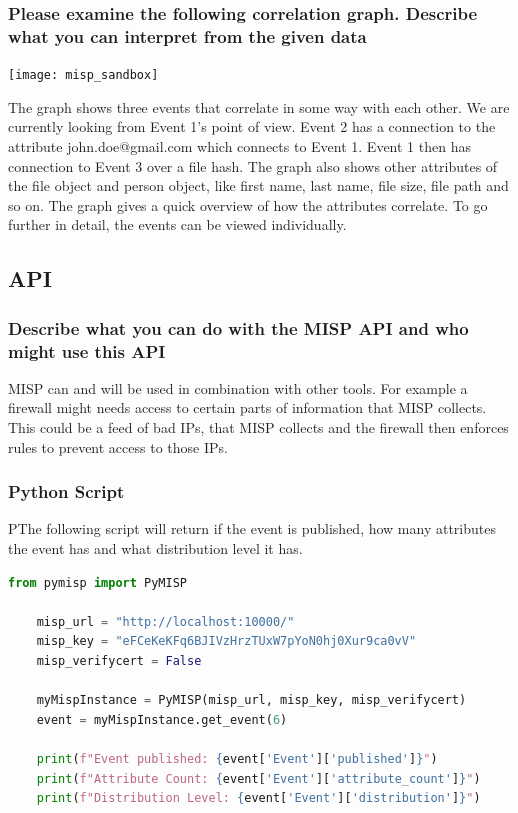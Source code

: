 \subsubsection{Please examine the following correlation graph. Describe what you can interpret from the given data}
\begin{center}
    \texttt{[image: misp\_sandbox]}
    \vspace{-8pt}
\end{center}

The graph shows three events that correlate in some way with each other. We are currently looking from Event 1's point of view. Event 2 has a connection to the attribute john.doe@gmail.com which connects to Event 1. Event 1 then has connection to Event 3 over a file hash.
The graph also shows other attributes of the file object and person object, like first name, last name, file size, file path and so on.
The graph gives a quick overview of how the attributes correlate. To go further in detail, the events can be viewed individually.

\subsection{API}

\subsubsection{Describe what you can do with the MISP API and who might use this API}
MISP can and will be used in combination with other tools. For example a firewall might needs access to certain parts of information that MISP collects. This could be a feed of bad IPs, that MISP collects and the firewall then enforces rules to prevent access to those IPs.

\subsubsection{Python Script}
PThe following script will return if the event is published, how many attributes the event has and what distribution level it has.

\begin{lstlisting}[language=Python]
    from pymisp import PyMISP

    misp_url = "http://localhost:10000/"
    misp_key = "eFCeKeKFq6BJIVzHrzTUxW7pYoN0hj0Xur9ca0vV"
    misp_verifycert = False

    myMispInstance = PyMISP(misp_url, misp_key, misp_verifycert)
    event = myMispInstance.get_event(6)

    print(f"Event published: {event['Event']['published']}")
    print(f"Attribute Count: {event['Event']['attribute_count']}")
    print(f"Distribution Level: {event['Event']['distribution']}")
\end{lstlisting}



